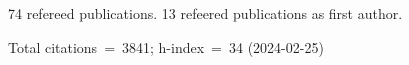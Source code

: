 74 refereed publications. 13 refeered publications as first author.

Total citations~=~3841; h-index~=~34 (2024-02-25)